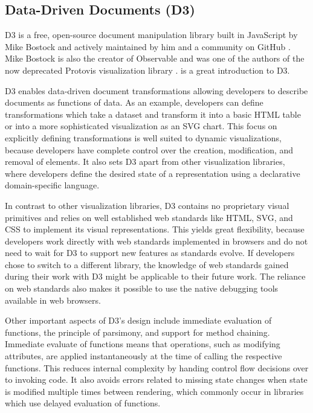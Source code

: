 \subsection{Data-Driven Documents (D3)}

D3 \parencite{D3} is a free, open-source document manipulation library
built in JavaScript by Mike Bostock and actively maintained by him and
a community on GitHub \parencite{D3JS}. Mike Bostock is also the
creator of Observable \parencite{Observable} and was one of the
authors of the now deprecated Protovis visualization library
\parencite{Protovis}. \textcite{Wattenberger-D3} is a great
introduction to D3.

D3 enables data-driven document transformations allowing developers to
describe documents as functions of data. As an example, developers can
define transformations which take a dataset and transform it into a
basic HTML table or into a more sophisticated visualization as an SVG
chart. This focus on explicitly defining transformations is well
suited to dynamic visualizations, because developers have complete
control over the creation, modification, and removal of elements. It
also sets D3 apart from other visualization libraries, where
developers define the desired state of a representation using a
declarative domain-specific language.

In contrast to other visualization libraries, D3 contains no
proprietary visual primitives and relies on well established web
standards like HTML, SVG, and CSS to implement its visual
representations. This yields great flexibility, because developers
work directly with web standards implemented in browsers and do not
need to wait for D3 to support new features as standards
evolve. If developers chose to switch to a different library, the
knowledge of web standards gained during their work with D3 might be
applicable to their future work. The reliance on web standards also
makes it possible to use the native debugging tools available in web
browsers.


Other important aspects of D3's design include immediate evaluation of
functions, the principle of parsimony, and support for method
chaining. Immediate evaluate of functions means that operations, such
as modifying attributes, are applied instantaneously at the time of
calling the respective functions. This reduces internal complexity by
handing control flow decisions over to invoking code. It also avoids
errors related to missing state changes when state is modified
multiple times between rendering, which commonly occur in libraries
which use delayed evaluation of functions.

